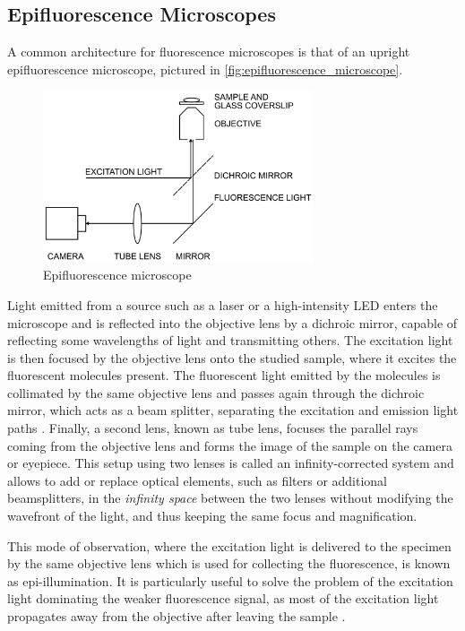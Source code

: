 \subsection{Epifluorescence Microscopes} \label{sec:epifluorescence_microscopes}
A common architecture for fluorescence microscopes is that of an upright epifluorescence microscope, pictured in \autoref{fig:epifluorescence_microscope}.
%
\begin{figure}[htbp]  
    \centering
    \includegraphics[width=8cm]{figures/epifluorescence-microscope.png}
    \caption{Epifluorescence microscope \cite{douglass_notice_2023}}
    \label{fig:epifluorescence_microscope}
\end{figure}
%
Light emitted from a source such as a laser or a high-intensity LED enters the microscope and is reflected into the objective lens by a dichroic mirror, capable of reflecting some wavelengths of light and transmitting others.
The excitation light is then focused by the objective lens onto the studied sample, where it excites the fluorescent molecules present.
The fluorescent light emitted by the molecules is collimated by the same objective lens and passes again through the dichroic mirror, which acts as a beam splitter, separating the excitation and emission light paths \cite{sachl_introduction_2022}.
Finally, a second lens, known as tube lens, focuses the parallel rays coming from the objective lens and forms the image of the sample on the camera or eyepiece.
This setup using two lenses is called an infinity-corrected system and allows to add or replace optical elements, such as filters or additional beamsplitters, in the \emph{infinity space} between the two lenses  without modifying the wavefront of the light, and thus keeping the same focus and magnification.

This mode of observation, where the excitation light is delivered to the specimen by the same objective lens which is used for collecting the fluorescence, is known as epi-illumination.
It is particularly useful to solve the problem of the excitation light dominating the weaker fluorescence signal, as most of the excitation light propagates away from the objective after leaving the sample \cite{douglass_notice_2023}.


